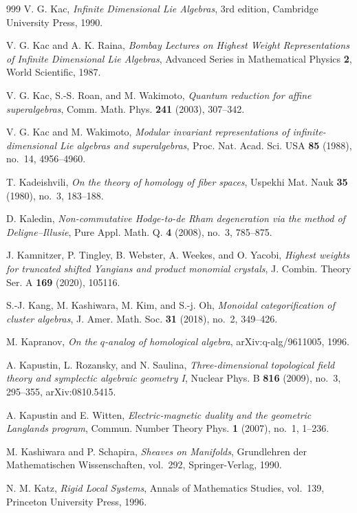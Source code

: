 \begin{thebibliography}{999}
V. G. Kac, \emph{Infinite Dimensional Lie Algebras}, 3rd edition, Cambridge University Press, 1990.

V. G. Kac and A. K. Raina, \emph{Bombay Lectures on Highest Weight Representations of Infinite Dimensional Lie Algebras}, Advanced Series in Mathematical Physics \textbf{2}, World Scientific, 1987.

V. G. Kac, S.-S. Roan, and M. Wakimoto, \emph{Quantum reduction for affine superalgebras}, Comm. Math. Phys. \textbf{241} (2003), 307--342.

V. G. Kac and M. Wakimoto, \emph{Modular invariant representations of infinite-dimensional Lie algebras and superalgebras}, Proc. Nat. Acad. Sci. USA \textbf{85} (1988), no.~14, 4956--4960.

T. Kadeishvili, \emph{On the theory of homology of fiber spaces}, Uspekhi Mat. Nauk \textbf{35} (1980), no.~3, 183--188.

D. Kaledin, \emph{Non-commutative Hodge-to-de Rham degeneration via the method of Deligne--Illusie}, Pure Appl. Math. Q. \textbf{4} (2008), no.~3, 785--875.

J. Kamnitzer, P. Tingley, B. Webster, A. Weekes, and O. Yacobi, \emph{Highest weights for truncated shifted Yangians and product monomial crystals}, J. Combin. Theory Ser. A \textbf{169} (2020), 105116.

S.-J. Kang, M. Kashiwara, M. Kim, and S.-j. Oh, \emph{Monoidal categorification of cluster algebras}, J. Amer. Math. Soc. \textbf{31} (2018), no.~2, 349--426.

M. Kapranov, \emph{On the $q$-analog of homological algebra}, arXiv:q-alg/9611005, 1996.

A. Kapustin, L. Rozansky, and N. Saulina, \emph{Three-dimensional topological field theory and symplectic algebraic geometry I}, Nuclear Phys. B \textbf{816} (2009), no.~3, 295--355, arXiv:0810.5415.

A. Kapustin and E. Witten, \emph{Electric-magnetic duality and the geometric Langlands program}, Commun. Number Theory Phys. \textbf{1} (2007), no.~1, 1--236.

M. Kashiwara and P. Schapira, \emph{Sheaves on Manifolds}, Grundlehren der Mathematischen Wissenschaften, vol.~292, Springer-Verlag, 1990.

N. M. Katz, \emph{Rigid Local Systems}, Annals of Mathematics Studies, vol.~139, Princeton University Press, 1996.


\end{thebibliography}
